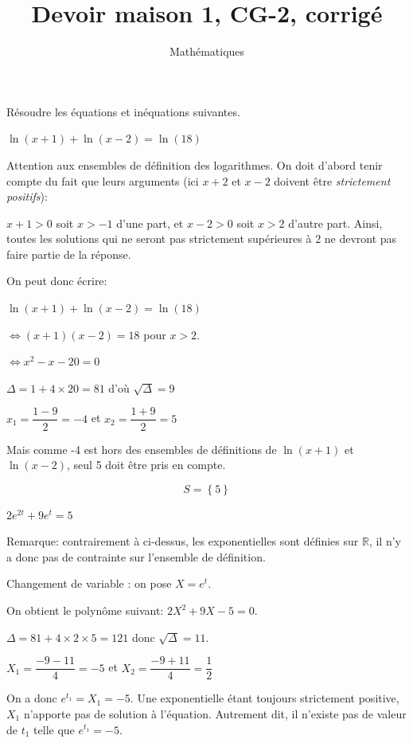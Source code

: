 \documentclass[a4paper,12pt]{scrartcl}
\date{}
\title{Devoir maison 1, CG-2, corrigé}
\author{Mathématiques}
\begin{document}
\maketitle


Résoudre les équations et inéquations suivantes.

\question{}
$\ln(x+1) + \ln(x-2) = \ln(18)$

Attention aux ensembles de définition des logarithmes. On doit d'abord tenir compte du fait que leurs arguments (ici $x+2$ et $x-2$ doivent être \emph{strictement positifs}):

$x+1 > 0$ soit $x > -1$ d'une part, et $x-2 > 0$ soit $x>2$ d'autre part. Ainsi, toutes les solutions qui ne seront pas strictement supérieures à 2 ne devront pas faire partie de la réponse. 

On peut donc écrire: 

$\ln(x+1) + \ln(x-2) = \ln(18)$

$\Leftrightarrow (x+1)(x-2) = 18$ pour $x > 2$.

$\Leftrightarrow x^2 - x - 20 = 0$

$\Delta = 1 + 4 \times 20 = 81$ d'où $\sqrt{\Delta} = 9$

$x_1 = \dfrac{1 - 9}{2} = -4$ et 
$x_2 = \dfrac{1 + 9}{2} = 5$

Mais comme -4 est hors des ensembles de définitions de $\ln(x+1)$ et $\ln(x-2)$, seul 5 doit être pris en compte.

$$S = \left\lbrace 5 \right\rbrace$$

\question{}
$2e^{2t} + 9e^t = 5$

Remarque: contrairement à ci-dessus, les exponentielles sont définies sur $\mathbb{R}$, il n'y a donc pas de contrainte sur l'ensemble de définition.

Changement de variable : on pose $X = e^t$.

On obtient le polynôme suivant: $2X^2 + 9X - 5 = 0$. 

$\Delta = 81 + 4 \times 2 \times 5 = 121$ donc $\sqrt{\Delta} = 11$.

$X_1 = \dfrac{-9 - 11}{4} = -5$ et 
$X_2 = \dfrac{-9 + 11}{4} = \dfrac{1}{2}$


On a donc $e^{t_1} = X_1 = -5$. Une exponentielle étant toujours strictement positive, $X_1$ n'apporte pas de solution à l'équation. Autrement dit, il n'existe pas de valeur de $t_1$ telle que $e^{t_1} = -5$.
\end{document}
